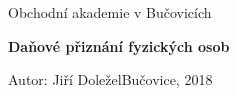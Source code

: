 \documentclass[a4paper,12pt]{article}
\begin{document}
\centering
Obchodní akademie v Bučovicích
\vspace{0.25\textheight}

\textbf{\fontsize{20.74pt}{23pt}\selectfont
Daňové přiznání fyzických osob}
\vspace{0.5\textheight}

Autor: Jiří Doležel\hfill Bučovice, 2018
\end{document}
